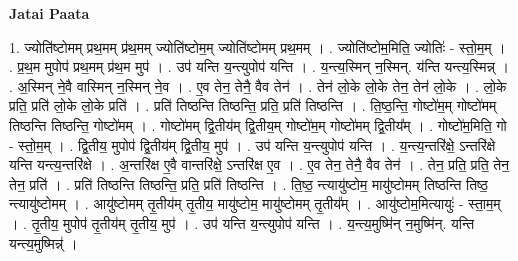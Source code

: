 \documentclass[17pt]{extarticle}
\begin{document}
\textbf{Jatai Paata} \newline

1. ज्योति॑ष्टोमम् प्रथ॒मम् प्र॑थ॒मम् ज्योति॑ष्टोम॒म् ज्योति॑ष्टोमम् प्रथ॒मम् । . ज्योति॑ष्टोम॒मिति॒ ज्योतिः॑ - स्तो॒म॒म् । . प्र॒थ॒म मुपोप॑ प्रथ॒मम् प्र॑थ॒म मुप॑ । . उप॑ यन्ति य॒न्त्युपोप॑ यन्ति । . य॒न्त्य॒स्मिन् न॒स्मिन्. य॑न्ति यन्त्य॒स्मिन्न् । . अ॒स्मिन् ने॒वै वास्मिन् न॒स्मिन् ने॒व । . ए॒व तेन॒ तेनै॒ वैव तेन॑ । . तेन॑ लो॒के लो॒के तेन॒ तेन॑ लो॒के । . लो॒के प्रति॒ प्रति॑ लो॒के लो॒के प्रति॑ । . प्रति॑ तिष्ठन्ति तिष्ठन्ति॒ प्रति॒ प्रति॑ तिष्ठन्ति । . ति॒ष्ठ॒न्ति॒ गोष्टो॑म॒म् गोष्टो॑मम् तिष्ठन्ति तिष्ठन्ति॒ गोष्टो॑मम् । . गोष्टो॑मम् द्वि॒तीय॑म् द्वि॒तीय॒म् गोष्टो॑म॒म् गोष्टो॑मम् द्वि॒तीय᳚म् । . गोष्टो॑म॒मिति॒ गो - स्तो॒म॒म् । . द्वि॒तीय॒ मुपोप॑ द्वि॒तीय॑म् द्वि॒तीय॒ मुप॑ । . उप॑ यन्ति य॒न्त्युपोप॑ यन्ति । . य॒न्त्य॒न्तरि॑क्षे॒ ऽन्तरि॑क्षे यन्ति यन्त्य॒न्तरि॑क्षे । . अ॒न्तरि॑क्ष ए॒वै वान्तरि॑क्षे॒ ऽन्तरि॑क्ष ए॒व । . ए॒व तेन॒ तेनै॒ वैव तेन॑ । . तेन॒ प्रति॒ प्रति॒ तेन॒ तेन॒ प्रति॑ । . प्रति॑ तिष्ठन्ति तिष्ठन्ति॒ प्रति॒ प्रति॑ तिष्ठन्ति । . ति॒ष्ठ॒ न्त्यायु॑ष्टोम॒ मायु॑ष्टोमम् तिष्ठन्ति तिष्ठ॒ न्त्यायु॑ष्टोमम् । . आयु॑ष्टोमम् तृ॒तीय॑म् तृ॒तीय॒ मायु॑ष्टोम॒ मायु॑ष्टोमम् तृ॒तीय᳚म् । . आयु॑ष्टोम॒मित्यायुः॑ - स्ता॒म॒म् । . तृ॒तीय॒ मुपोप॑ तृ॒तीय॑म् तृ॒तीय॒ मुप॑ । . उप॑ यन्ति य॒न्त्युपोप॑ यन्ति । . य॒न्त्य॒मुष्मि॑न् न॒मुष्मि॑न्. यन्ति यन्त्य॒मुष्मिन्न्॑ । \newline
\end{document}

